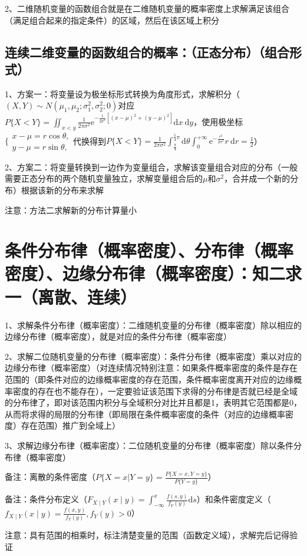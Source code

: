 2、二维随机变量的函数组合就是在二维随机变量的概率密度上求解满足该组合（满足组合起来的指定条件）的区域，然后在该区域上积分



\subsection{连续二维变量的函数组合的概率：（正态分布）（组合形式）}

1、方案一：将变量设为极坐标形式转换为角度形式，求解积分（$(X, Y) \sim N\left(\mu_{1}, \mu_{2} ; \sigma_{1}^{2}, \sigma_{2}^{2} ; 0\right)$对应$P\{X<Y\}=\iint_{x<y} \frac{1}{2 \pi \sigma^{2}} \mathrm{e}^{-\frac{1}{2 \sigma^{2}}\left[(x-\mu)^{2}+(y-\mu)^{2}\right]} \mathrm{d} x \mathrm{~d} y$，使用极坐标$\{\begin{array}{l}x-\mu=r \cos \theta, \\ y-\mu=r \sin \theta,\end{array}$代换得到$P\{X<Y\}=\frac{1}{2 \pi \sigma^{2}} \int_{\frac{\pi}{4}}^{\frac{5}{4} \pi} \mathrm{d} \theta \int_{0}^{+\infty} \mathrm{e}^{-\frac{r^{2}}{2 \sigma^{2}}} r \mathrm{~d} r=\frac{1}{2}$）

2、方案二：将变量转换到一边作为变量组合，求解该变量组合对应的分布（一般需要正态分布的两个随机变量独立，求解变量组合后的$\mu$和$\sigma^{2}$，合并成一个新的分布）根据该新的分布来求解

注意：方法二求解新的分布计算量小



\section{条件分布律（概率密度）、分布律（概率密度）、边缘分布律（概率密度）：知二求一（离散、连续）}

1、求解条件分布律（概率密度）：二维随机变量的分布律（概率密度）除以相应的边缘分布律（概率密度），就是对应的条件分布律（概率密度）

2、求解二位随机变量的分布律（概率密度）：条件分布律（概率密度）乘以对应的边缘分布律（概率密度）（对连续情况特别注意：如果条件概率密度的条件是存在范围的（即条件对应的边缘概率密度的存在范围，条件概率密度离开对应的边缘概率密度的存在也不能存在），一定要验证该范围下求得的分布律是否就已经是全域的分布律了，即对该范围内积分与全域积分对比并且都是1，表明其它范围都是0，从而将求得的局限的分布律（即局限在条件概率密度的条件（对应的边缘概率密度）存在范围）推广到全域上）

3、求解边缘分布律（概率密度）：二位随机变量的分布律（概率密度）除以条件分布律（概率密度）

备注：离散的条件密度（$P\{X=x|Y=y\} = \frac {P\{X=x,Y=y\}}{P\{Y=y\}}$）

备注：条件分布定义（$F_{X \mid Y}(x \mid y)=\int_{-\infty}^{x} \frac{f(s, y)}{f_{Y}(y)} \mathrm{d} s$）和条件密度定义（$f_{X \mid Y}(x \mid y)=\frac{f(x, y)}{f_{Y}(y)}, f_{Y}(y)>0$）

注意：具有范围的相乘时，标注清楚变量的范围（函数定义域），求解完后记得验证

